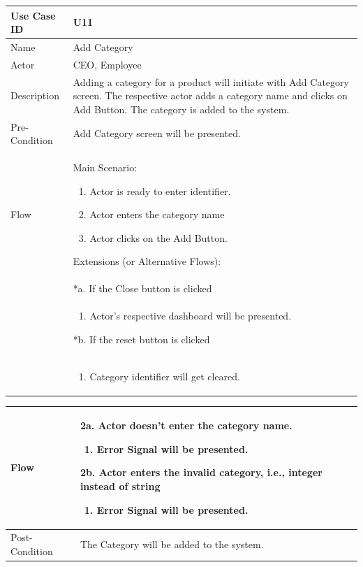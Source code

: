 \documentclass[12pt,a4paper]{report}
\begin{document}
\begin{tabular}{ | m{3cm} | m{12cm}| } \hline

Use Case ID &  U11 \\\hline

Name  	    &  Add Category \\ \hline

Actor     	& CEO, Employee \\ \hline

Description &  Adding a category for a product will initiate with Add Category screen. The respective actor adds a category name and clicks on Add Button. The category is added to the system.  \\ \hline

Pre-Condition &  Add Category screen will be presented. \\ \hline

Flow & Main Scenario:

\begin{enumerate}

\item Actor is ready to enter identifier.
\item Actor enters the category name
\item Actor clicks on the Add Button.

\end{enumerate}

Extensions (or Alternative Flows):\\
& *a. If the Close button is clicked \\
& \begin{enumerate}
		\item Actor's respective dashboard will be presented.
	\end{enumerate}
*b. If the reset button is clicked \\
&	\begin{enumerate}
		\item Category identifier will get cleared.
	\end{enumerate}
\\ \hline
\end{tabular}
\begin{tabular}{ | m{3cm} | m{12cm}| } \hline
Flow & 2a. Actor doesn't enter the category name.
 	\begin{enumerate}
		\item Error Signal will be presented.
	\end{enumerate}
2b. Actor enters the invalid category, i.e., integer instead of string
	\begin{enumerate}
		\item Error Signal will be presented.
	\end{enumerate}
\\ \hline
Post-Condition &    The Category will be added to the system. \\ \hline

\end{tabular}
\end{document}
